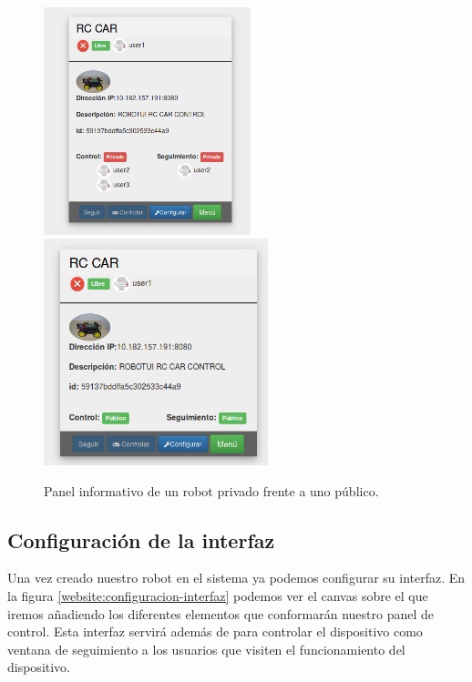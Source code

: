 \begin{figure}[H]
    \centering
    \includegraphics[width=6cm]{imagenes/manual-usuario/robot-privado.png}
    \qquad
    \includegraphics[width=6.5cm]{imagenes/manual-usuario/robot-publico.png}
    \caption{Panel informativo de un robot privado frente a uno público.}%
    \label{fig:http-request}%
\end{figure}


\subsection{Configuración de la interfaz}

Una vez creado nuestro robot en el sistema ya podemos configurar su interfaz. En la figura \ref{website:configuracion-interfaz} podemos ver el canvas sobre el que iremos añadiendo los diferentes elementos que 
conformarán nuestro panel de control. Esta interfaz servirá además de para controlar el dispositivo como ventana de seguimiento a los usuarios que visiten el funcionamiento del dispositivo.

